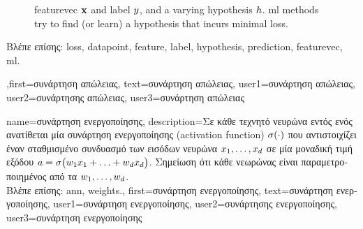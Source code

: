 {{\begin{figure}[H]
{				\gls{featurevec} ${\bf x}$ and \gls{label} $y$, and a varying \gls{hypothesis} $h$. 
				\gls{ml} methods try to find (or learn) a \gls{hypothesis} that incurs minimal \gls{loss}.}
			\label{fig_loss_function_gls_dict}
	\end{figure}
	\foreignlanguage{greek}{Βλέπε επίσης:} \gls{loss}, \gls{datapoint}, \gls{feature}, \gls{label}, \gls{hypothesis}, \gls{prediction}, \gls{featurevec}, \gls{ml}.
 },first={\foreignlanguage{greek}{συνάρτηση απώλειας}},
 text={\foreignlanguage{greek}{συνάρτηση απώλειας}},
 user1={\foreignlanguage{greek}{συνάρτηση απώλειας}}, %
 user2={\foreignlanguage{greek}{συνάρτησης απώλειας}}, %
 user3={\foreignlanguage{greek}{συ\-νάρ\-τη\-ση απώλειας}} %
 }

{name={\foreignlanguage{greek}{συνάρτηση ενεργοποίησης}},
	description={\foreignlanguage{greek}{Σε κάθε τεχνητό νευρώνα εντός ενός} 
		 \foreignlanguage{greek}{ανατίθεται μία συνάρτηση ενεργοποίησης} (activation function)   
		$\sigma(\cdot)$ \foreignlanguage{greek}{που αντιστοιχίζει έναν σταθμισμένο συνδυασμό των εισόδων 
		νευρώνα} $x_{1},\ldots,x_{d}$ \foreignlanguage{greek}{σε μία μοναδική τιμή εξόδου} 
		$a = \sigma\big(w_{1} x_{1}+\ldots+w_{d} x_{d} \big)$. 
		\foreignlanguage{greek}{Σημείωση ότι κάθε νεωρώνας είναι παραμετροποιημένος από τα} 
		 $w_{1},\ldots,w_{d}$.\\
		\foreignlanguage{greek}{Βλέπε επίσης:} \gls{ann}, \gls{weights}.},
first={\foreignlanguage{greek}{συνάρτηση ενεργοποίησης}},
text={\foreignlanguage{greek}{συνάρτηση ενεργοποίησης}},
user1={\foreignlanguage{greek}{συνάρτηση ενεργοποίησης}}, %
user2={\foreignlanguage{greek}{συνάρτησης ενεργοποίησης}}, %
user3={\foreignlanguage{greek}{συνάρτηση ενεργοποίησης}} %
}

